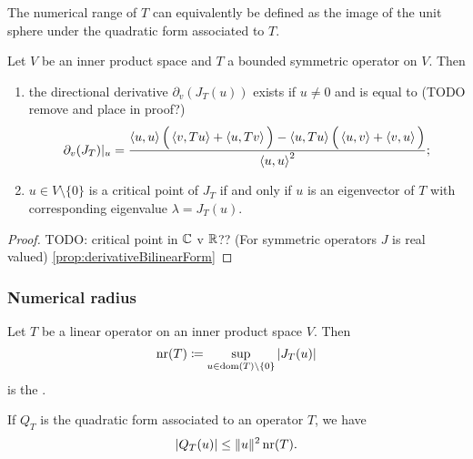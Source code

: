 The numerical range of $T$ can equivalently be defined as the image of the unit sphere under the quadratic form associated to $T$.

\begin{lemma}
Let $V$ be an inner product space and $T$ a bounded symmetric operator on $V$. Then
\begin{enumerate}
\item the directional derivative $\partial_v(J_T(u))$ exists if $u\neq 0$ and is equal to (TODO remove and place in proof?)
\[ \partial_v(J_T)|_u = \frac{\left\langle u,u \right\rangle\Big( \left\langle v,Tu \right\rangle + \left\langle u,Tv \right\rangle \Big) - \left\langle u,Tu \right\rangle\Big(\left\langle u,v \right\rangle+\left\langle v,u \right\rangle\Big)}{\left\langle u,u \right\rangle^2}; \]
\item $u\in V\setminus \{ 0 \}$ is a critical point of $J_T$ \textup{if and only if} $u$ is an eigenvector of $T$ with corresponding eigenvalue $\lambda = J_T(u)$.
\end{enumerate}
\end{lemma}
\begin{proof}
TODO: critical point in $\mathbb{C}$ v $\mathbb{R}$?? (For symmetric operators $J$ is real valued)
\ref{prop:derivativeBilinearForm}
\end{proof}

\subsubsection{Numerical radius}
\begin{definition}
Let $T$ be a linear operator on an inner product space $V$. Then
\[ \operatorname{nr}(T) \coloneqq \sup_{u\in \operatorname{dom}(T)\setminus\{0\}} |J_T(u)| \]
is the .
\end{definition}
If $Q_T$ is the quadratic form associated to an operator $T$, we have
\[ |Q_T(u)| \leq \lVert u\rVert^2\operatorname{nr}(T). \]

